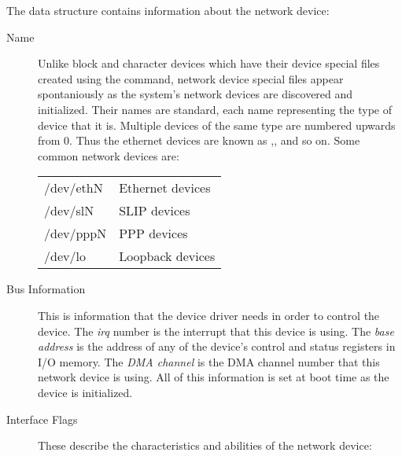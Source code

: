 The  data structure contains information about the network device:
\begin{description}
	\item [Name] Unlike block and character devices which have their device special files created
		using the  command, network device special files appear spontaniously as the
		system's network devices are discovered and initialized.
		Their names are standard, each name representing the type of device that it is.
		Multiple devices of the same type are numbered upwards from 0.  Thus the ethernet
		devices are known as ,, and so on.  Some common network
		devices are:

		\begin{tabular}{ll}
		/dev/ethN   	&	Ethernet devices 	\\
		/dev/slN	&	SLIP devices 		\\
		/dev/pppN	&	PPP devices		\\
		/dev/lo 	&	Loopback devices	\\
		\end{tabular}
	\item [Bus Information] This is information that the device driver needs in order to control
		the device.   The {\em irq} number is the interrupt that this device is using.
		The {\em base address} is the address of any of the device's control and status registers
		in I/O memory.  The {\em DMA channel} is the DMA channel number that this network device is using.
		All of this information is set at boot time as the device is initialized.

	\item [Interface Flags] These describe the characteristics and abilities of the network device:


\end{description}

